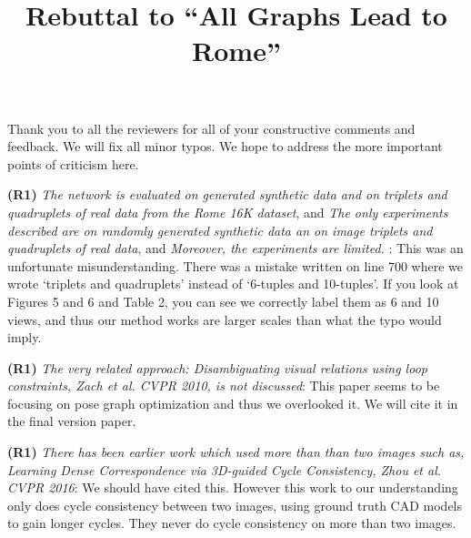 \documentclass[10pt,twocolumn,letterpaper]{article}
\begin{document}
\title{Rebuttal to ``All Graphs Lead to Rome''}  %

\maketitle
\thispagestyle{empty}


Thank you to all the reviewers for all of your constructive comments and feedback.
We will fix all minor typos. 
We hope to address the more important points of criticism here.


\textbf{(R1)}
\textit{The network is evaluated on generated synthetic data and on triplets and quadruplets of real data from the Rome 16K dataset}, and
\textit{The only experiments described are on randomly generated synthetic data an on image triplets and quadruplets of real data}, and
\textit{Moreover, the experiments are limited.}
:
This was an unfortunate misunderstanding.
There was a mistake written on line 700 where we wrote `triplets and quadruplets' instead of `6-tuples and 10-tuples'.
If you look at Figures 5 and 6 and Table 2, you can see we correctly label them as 6 and 10 views, and thus our method works are larger scales than what the typo would imply.

\textbf{(R1)} \textit{The very related approach: Disambiguating visual relations using loop constraints, Zach et al. CVPR 2010, is not discussed}:
This paper seems to be focusing on pose graph optimization and thus we overlooked it.
We will cite it in the final version paper.

\textbf{(R1)} \textit{There has been earlier work which used more than than two images such as, Learning Dense Correspondence via 3D-guided Cycle Consistency, Zhou et al. CVPR 2016}:
We should have cited this.
However this work \cite{zhou2016learning} to our understanding only does cycle consistency between two images, using ground truth CAD models to gain longer cycles.
They never do cycle consistency on more than two images. 
\end{document}
